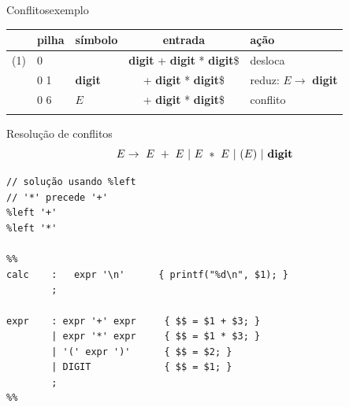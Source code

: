 \begin{frame}{Conflitos}{exemplo}
\centering\small
  \bigskip

  \scriptsize
  \begin{tabular}[h]{r|l|l|c|l}
    \toprule
    & \hfil pilha &\hfil símbolo & entrada &\hfil ação \\
    \midrule
    (1) & 0 &  &\hfill {\bf digit} + {\bf digit} * {\bf digit}\$& desloca \\
    \only<2->{
    (2) & 0 1 &   {\bf digit} &\hfill + {\bf digit} * {\bf digit}\$ & reduz: $E\rightarrow$ {\bf digit} \\
    }
    \only<3->{
    (3) & 0 6 &   $E$ &\hfill + {\bf digit} * {\bf digit}\$ & {\large\color{red}conflito} \\
    }
    & & & &\\
   \bottomrule
  \end{tabular}
\end{frame}

\begin{frame}[fragile]{Resolução de conflitos}
  $$E \rightarrow\ E\ +\ E\ |\ E\ *\ E\ |\ (E)\ |\ \text{\bf digit} $$

  \small


\begin{lstlisting}
// solução usando %left
// '*' precede '+'
%left '+'
%left '*'

%%
calc    :   expr '\n'      { printf("%d\n", $1); }
        ;

expr    : expr '+' expr     { $$ = $1 + $3; }
        | expr '*' expr     { $$ = $1 * $3; }
        | '(' expr ')'      { $$ = $2; }
        | DIGIT             { $$ = $1; }
        ;
%%
\end{lstlisting}
\end{frame}

